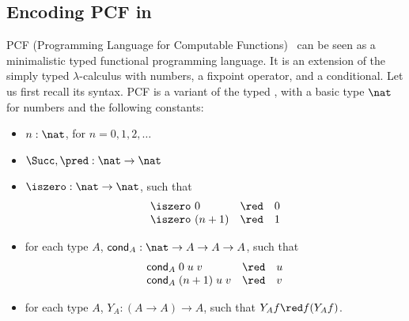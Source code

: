 \documentclass{article}
\begin{document}
\subsection{Encoding PCF  in \LLCIrec}

PCF (Programming Language for Computable
Functions)~\cite{Plotkin77} can be seen as a minimalistic typed
 functional
programming language.
It is an extension of the simply typed $\lambda$-calculus with numbers, 
a fixpoint operator, and a conditional.
Let us first recall its syntax.  PCF  is a variant of the typed \lam,
with a basic type $\nat$ for numbers and the following constants:
\begin{itemize}
\item $n: \nat$, for $n = 0,1,2,\dots$
\item $\Succ, \pred : \nat \to \nat$
\item $\iszero : \nat \to \nat$, such that
\[
\begin{array}{lcl}
\iszero\ 0 &\red &0\\
\iszero\ (n+1) &\red & 1
\end{array}
\]
\item for each type $A$, $\mathsf{cond}_{A} : \nat \to A \to A \to A$,
such that
\[
\begin{array}{lcl}
\mathsf{cond}_{A}\;{0}\;{u}\;{v}& \red & u \\
\mathsf{cond}_{A}\;{(n+1)}\;{u}\;{v} &\red & v
\end{array}
\]
\item for each type $A$, $Y_{A} :(A \to A) \to A$, such that
$Y_{A} f \red f(Y_{A} f)$.
\end{itemize}
\end{document}
